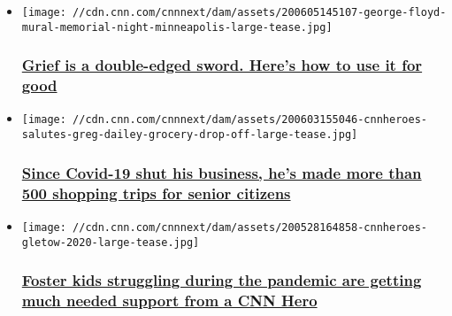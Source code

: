 \begin{itemize}
\item
  \href{/2020/06/05/opinions/coronavirus-george-floyd-grief-march-grier/index.html}{}

  \texttt{[image: //cdn.cnn.com/cnnnext/dam/assets/200605145107-george-floyd-mural-memorial-night-minneapolis-large-tease.jpg]}

  \hypertarget{grief-is-a-double-edged-sword-heres-how-to-use-it-for-good}{%
  \subsubsection{\texorpdfstring{\href{/2020/06/05/opinions/coronavirus-george-floyd-grief-march-grier/index.html}{Grief
  is a double-edged sword. Here's how to use it for
  good}}{Grief is a double-edged sword. Here's how to use it for good}}\label{grief-is-a-double-edged-sword-heres-how-to-use-it-for-good}}
\end{itemize}

\begin{itemize}
\item
  \href{/2020/06/04/us/coronavirus-newspaper-deliveryman-groceries-senior-citizens-cnnheroes-trnd/index.html}{}

  \texttt{[image: //cdn.cnn.com/cnnnext/dam/assets/200603155046-cnnheroes-salutes-greg-dailey-grocery-drop-off-large-tease.jpg]}

  \hypertarget{since-covid-19-shut-his-business-hes-made-more-than-500-shopping-trips-for-senior-citizens}{%
  \subsubsection{\texorpdfstring{\href{/2020/06/04/us/coronavirus-newspaper-deliveryman-groceries-senior-citizens-cnnheroes-trnd/index.html}{Since
  Covid-19 shut his business, he's made more than 500 shopping trips for
  senior
  citizens}}{Since Covid-19 shut his business, he's made more than 500 shopping trips for senior citizens}}\label{since-covid-19-shut-his-business-hes-made-more-than-500-shopping-trips-for-senior-citizens}}
\end{itemize}

\begin{itemize}
\item
  \href{/2020/05/28/us/coronavirus-foster-kids-support-cnnheroes/index.html}{}

  \texttt{[image: //cdn.cnn.com/cnnnext/dam/assets/200528164858-cnnheroes-gletow-2020-large-tease.jpg]}

  \hypertarget{foster-kids-struggling-during-the-pandemic-are-getting-much-needed-support-from-a-cnn-hero}{%
  \subsubsection{\texorpdfstring{\href{/2020/05/28/us/coronavirus-foster-kids-support-cnnheroes/index.html}{Foster
  kids struggling during the pandemic are getting much needed support
  from a CNN
  Hero}}{Foster kids struggling during the pandemic are getting much needed support from a CNN Hero}}\label{foster-kids-struggling-during-the-pandemic-are-getting-much-needed-support-from-a-cnn-hero}}
\end{itemize}

